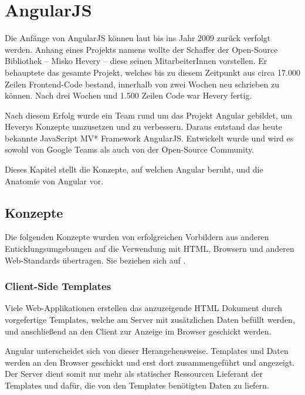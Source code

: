 
\newpage
\section{AngularJS}
\label{AngularJS}
Die Anfänge von AngularJS können laut \cite{Green:2013} bis ins Jahr 2009 zurück verfolgt werden. Anhang eines Projekts namens  wollte der Schaffer der Open-Source Bibliothek -- Misko Hevery -- diese seinen MitarbeiterInnen vorstellen. Er behauptete das gesamte Projekt, welches bis zu diesem Zeitpunkt aus circa 17.000 Zeilen Frontend-Code bestand, innerhalb von zwei Wochen neu schrieben zu können. Nach drei Wochen und 1.500 Zeilen Code war Hevery fertig.

Nach diesem Erfolg wurde ein Team rund um das Projekt Angular gebildet, um Heverys Konzepte umzusetzen und zu verbessern. Daraus entstand das heute bekannte JavaScript MV* Framework AngularJS. Entwickelt wurde und wird es sowohl von Google Teams als auch von der Open-Source Community.

Dieses Kapitel stellt die Konzepte, auf welchen Angular beruht, und die Anatomie von Angular vor.

\subsection{Konzepte}
Die folgenden Konzepte wurden von erfolgreichen Vorbildern aus anderen Enticklungsumgebungen auf die Verwendung mit HTML, Browsern und anderen Web-Standards übertragen. Sie beziehen sich auf \cite[2-6]{Green:2013}.

\subsubsection{Client-Side Templates}
Viele Web-Applikationen erstellen das anzuzeigende HTML Dokument durch vorgefertige Templates, welche am Server mit zusätzlichen Daten befüllt werden, und anschließend an den Client zur Anzeige im Browser geschickt werden.

Angular unterscheidet sich von dieser Herangehensweise. Templates und Daten werden an den Browser geschickt und erst dort zusammengeführt und angezeigt. Der Server dient somit nur mehr als statischer Ressourcen Lieferant der Templates und dafür, die von den Templates benötigten Daten zu liefern.

